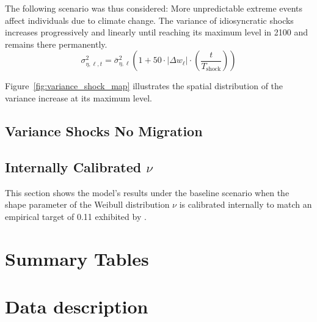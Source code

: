 \documentclass[12pt, a4paper]{article}
\begin{document}
The following scenario was thus considered: More unpredictable extreme events affect individuals due to climate change. The variance of idiosyncratic shocks increases progressively and linearly until reaching its maximum level in 2100 and remains there permanently.
    \begin{equation}
        \sigma^2_{\eta, \ell, t} = \bar{\sigma}^2_{\eta, \ell} \left( 1 + 50 \cdot |\Delta w_\ell| \cdot \left(\frac{t}{T_{\text{shock}}}\right) \right)
    \end{equation}

Figure~\ref{fig:variance_shock_map} illustrates the spatial distribution of the variance increase at its maximum level.










\subsection{Variance Shocks No Migration}







\subsection{Internally Calibrated $\nu$}
This section shows the model's results under the baseline scenario when the shape parameter of the Weibull distribution $\nu$ is calibrated internally to match an empirical target of 0.11 exhibited by \cite{dvorkin_geography_2025}. 










\section{Summary Tables}
\label{sec:summary}





\section{Data description}
\label{app:data}




\end{document}
